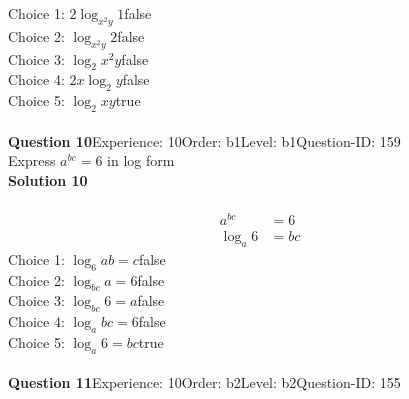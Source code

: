 \documentclass{article}
\begin{document}
Choice 1: \hspace{20pt}$2\log_{x^2y}1$\hspace{20pt}false\\
Choice 2: \hspace{20pt}$\log_{x^2y}2$\hspace{20pt}false\\
Choice 3: \hspace{20pt}$\log_{2}x^2y$\hspace{20pt}false\\
Choice 4: \hspace{20pt}$2x\log_{2}y$\hspace{20pt}false\\
Choice 5: \hspace{20pt}$\log_{2}xy$\hspace{20pt}true\\
\\[4pt]
\noindent\textbf{Question 10}\hspace{20pt}Experience: 10\hspace{20pt}Order: b1\hspace{20pt}Level: b1\hspace{20pt}Question-ID: 159\\[2pt]
Express $a^{bc}=6$ in log form\\[4pt]
\noindent\textbf{Solution 10}\\[2pt]
\\[-35pt]\begin{align*}
a^{bc}&=6\\[2pt]
\log_{a}6&=bc
\end{align*}
Choice 1: \hspace{20pt}$\log_{6}ab=c$\hspace{20pt}false\\
Choice 2: \hspace{20pt}$\log_{bc}a=6$\hspace{20pt}false\\
Choice 3: \hspace{20pt}$\log_{bc}6=a$\hspace{20pt}false\\
Choice 4: \hspace{20pt}$\log_{a}bc=6$\hspace{20pt}false\\
Choice 5: \hspace{20pt}$\log_{a}6=bc$\hspace{20pt}true\\
\\[4pt]
\noindent\textbf{Question 11}\hspace{20pt}Experience: 10\hspace{20pt}Order: b2\hspace{20pt}Level: b2\hspace{20pt}Question-ID: 155\\[2pt]
\end{document}
